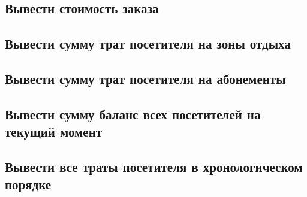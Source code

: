 \documentclass[a4paper]{article}
\begin{document}
\subsection{Вывести стоимость заказа}


\subsection{Вывести сумму трат посетителя на зоны отдыха}


\subsection{Вывести сумму трат посетителя на абонементы}


\subsection{Вывести сумму баланс всех посетителей на текущий момент}


\subsection{Вывести все траты посетителя в хронологическом порядке}


%

%

%
\end{document}
